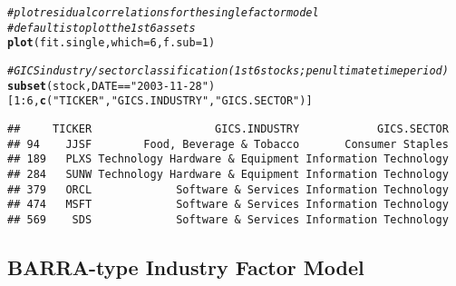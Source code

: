 \documentclass[a4paper]{article}\usepackage[]{graphicx}\usepackage[]{color}
\makeatletter
\newcommand{\hlnum}[1]{\textcolor[rgb]{0.686,0.059,0.569}{#1}}%
\newcommand{\hlstr}[1]{\textcolor[rgb]{0.192,0.494,0.8}{#1}}%
\newcommand{\hlcom}[1]{\textcolor[rgb]{0.678,0.584,0.686}{\textit{#1}}}%
\newcommand{\hlopt}[1]{\textcolor[rgb]{0,0,0}{#1}}%
\newcommand{\hlstd}[1]{\textcolor[rgb]{0.345,0.345,0.345}{#1}}%
\newcommand{\hlkwc}[1]{\textcolor[rgb]{0.333,0.667,0.333}{#1}}%
\newcommand{\hlkwd}[1]{\textcolor[rgb]{0.737,0.353,0.396}{\textbf{#1}}}%
\newenvironment{kframe}{%
 \def\at@end@of@kframe{}%
 \ifinner\ifhmode%
  \def\at@end@of@kframe{\end{minipage}}%
  \begin{minipage}{\columnwidth}%
 \fi\fi%
 \def\FrameCommand##1{\hskip\@totalleftmargin \hskip-\fboxsep
 \colorbox{shadecolor}{##1}\hskip-\fboxsep
     \hskip-\linewidth \hskip-\@totalleftmargin \hskip\columnwidth}%
 \MakeFramed {\advance\hsize-\width
   \@totalleftmargin\z@ \linewidth\hsize
   \@setminipage}}%
 {\par\unskip\endMakeFramed%
 \at@end@of@kframe}
\newenvironment{knitrout}{}{} %
\makeatother
\begin{document}
\begin{knitrout}
\color{fgcolor}\begin{kframe}
\begin{alltt}
\hlcom{# plot residual correlations for the single factor model}
\hlcom{# default is to plot the 1st 6 assets}
\hlkwd{plot}\hlstd{(fit.single,} \hlkwc{which}\hlstd{=}\hlnum{6}\hlstd{,} \hlkwc{f.sub}\hlstd{=}\hlnum{1}\hlstd{)}
\end{alltt}


{\ttfamily\noindent\bfseries\color{errorcolor}{\#\# Error in plot(fit.single, which = 6, f.sub = 1): object 'fit.single' not found}}\begin{alltt}
\hlcom{# GICS industry/sector classification (1st 6 stocks; penultimate time period)}
\hlkwd{subset}\hlstd{(stock,DATE}\hlopt{==}\hlstr{"2003-11-28"}\hlstd{)[}\hlnum{1}\hlopt{:}\hlnum{6}\hlstd{,}\hlkwd{c}\hlstd{(}\hlstr{"TICKER"}\hlstd{,}\hlstr{"GICS.INDUSTRY"}\hlstd{,}\hlstr{"GICS.SECTOR"}\hlstd{)]}
\end{alltt}
\begin{verbatim}
##     TICKER                   GICS.INDUSTRY            GICS.SECTOR
## 94    JJSF        Food, Beverage & Tobacco       Consumer Staples
## 189   PLXS Technology Hardware & Equipment Information Technology
## 284   SUNW Technology Hardware & Equipment Information Technology
## 379   ORCL             Software & Services Information Technology
## 474   MSFT             Software & Services Information Technology
## 569    SDS             Software & Services Information Technology
\end{verbatim}
\end{kframe}
\end{knitrout}

\newpage
\subsection{BARRA-type Industry Factor Model}
\end{document}
